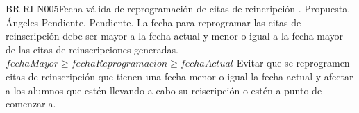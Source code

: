 \begin{BusinessRule}{BR-RI-N005}{Fecha válida de reprogramación de citas de reincripción}
	{\bcIntegridad}    %
	{\btEnabler}     %
	{\blControlling}    %
	.
	\BRItem[Estado] Propuesta.
	 Ángeles
	 Pendiente.
	 Pendiente.
	\BRItem[Descripción] La fecha para reprogramar las citas de reinscripción debe ser mayor a la fecha actual y menor o igual a la fecha mayor de las citas de reinscripciones generadas.
	\BRItem[Sentencia] $ fechaMayor \geq fechaReprogramacion \ge fechaActual$ %
	\BRItem[Motivación] Evitar que se reprogramen citas de reinscripción que tienen una fecha menor o igual  la fecha actual y afectar a los alumnos que estén llevando a cabo su reiscripción o estén a punto de comenzarla.
\end{BusinessRule}


